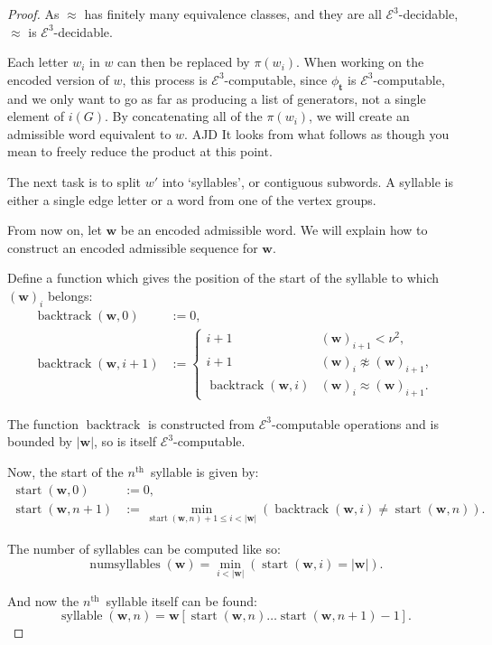 \documentclass[a4paper]{article}
\newcommand{\grz}[1]{$\mathcal{E}^{#1}$}	%
\newcommand{\nth}{$n^{\textrm{th}}$~}	%
\newcommand{\wvec}{\mathbf{w}}	%
\newcommand{\tvec}{\mathbf{t}}	%
\newcommand{\recur}[1]{\begin{equation} \begin{split} #1 \end{split} \end{equation}}	%
\theoremstyle{plain}
\theoremstyle{definition}
\newenvironment{ad}{\noindent\color{blue} AJD }{}
\newcommand{\ajd}[1]{
\begin{ad} #1 \end{ad}}
\begin{document}
\begin{proof}
As $\approx$ has finitely many equivalence classes, and they are all \grz{3}-decidable, $\approx$ is \grz{3}-decidable.

Each letter $w_i$ in $w$ can then be replaced by $\pi(w_i)$. When working on the encoded version of $w$, this process is \grz{3}-computable, since $\phi_{\tvec}$ is \grz{3}-computable, and we only want to go as far as producing a list of generators, not a single element of $i(G)$. By concatenating all of the $\pi(w_i)$, we will create an admissible word equivalent to $w$. \ajd{It looks 
from what follows as though you mean to freely reduce the product at this
point.}

The next task is to split $w'$ into `syllables', or contiguous subwords. A syllable is either a single edge letter or a word from one of the vertex groups.

From now on, let $\wvec$ be an encoded admissible word.  We will explain how to construct an encoded admissible sequence for $\wvec$.

Define a function which gives the position of the start of the syllable to which $(\wvec)_i$ belongs:
\recur{
	\operatorname{backtrack}(\wvec,0) &:= 0, \\
	\operatorname{backtrack}(\wvec,i+1) &:= \begin{cases}
																					i+1	&	(\wvec)_{i+1} < \nu^2, \\
																					i+1	&	(\wvec)_i \not \approx (\wvec)_{i+1}, \\
																					\operatorname{backtrack}(\wvec,i)	&	(\wvec)_i \approx (\wvec)_{i+1}.
																				\end{cases}
}

The function $\operatorname{backtrack}$ is constructed from \grz{3}-computable operations and is bounded by $|\wvec|$, so is itself \grz{3}-computable.

Now, the start of the \nth syllable is given by:
\recur{
\operatorname{start}(\wvec,0) &:= 0, \\
\operatorname{start}(\wvec,n+1) &:= \min_{\operatorname{start}(\wvec,n)+1 \leq i < |\wvec|} (\operatorname{backtrack}(\wvec,i) \neq \operatorname{start}(\wvec,n)).
}

The number of syllables can be computed like so:
\begin{equation} \operatorname{numsyllables}(\wvec) = \min_{i < |\wvec|} ( \operatorname{start}(\wvec,i) = |\wvec|). \end{equation}

And now the \nth syllable itself can be found:
\begin{equation} \operatorname{syllable}(\wvec,n) = \wvec[\operatorname{start}(\wvec,n) \dots \operatorname{start}(\wvec,n+1)-1]. \end{equation}


\end{proof}
\end{document}
